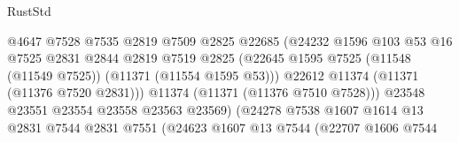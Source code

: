 \begin{lexlean}{RustStd}
\begin{coremodule}
                                            @4647
                                            @7528
                                            @7535
                                            @2819
                                            @7509
                                            @2825
                                            @22685
                                            (@24232
                                              @1596
                                              @103
                                              @53
                                              @16
                                              @7525
                                              @2831
                                              @2844
                                              @2819
                                              @7519
                                              @2825
                                              (@22645
                                                @1595
                                                @7525
                                                (@11548 (@11549 @7525))
                                                (@11371 (@11554 @1595 @53)))
                                              @22612
                                              @11374
                                              (@11371 (@11376 @7520 @2831)))
                                            @11374
                                            (@11371 (@11376 @7510 @7528)))
                                          @23548
                                          @23551
                                          @23554
                                          @23558
                                          @23563
                                          @23569)
                                        (@24278
                                          @7538
                                          @1607
                                          @1614
                                          @13
                                          @2831
                                          @7544
                                          @2831
                                          @7551
                                          (@24623
                                            @1607
                                            @13
                                            @7544
                                            (@22707
                                              @1606
                                              @7544

\end{coremodule}
\end{lexlean}
